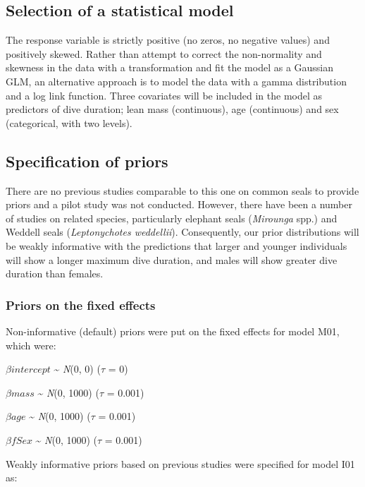 \documentclass[
]{book}
\begin{document}
\hypertarget{gamma-select}{%
\subsection{Selection of a statistical model}\label{gamma-select}}

The response variable is strictly positive (no zeros, no negative values) and positively skewed. Rather than attempt to correct the non-normality and skewness in the data with a transformation and fit the model as a Gaussian GLM, an alternative approach is to model the data with a gamma distribution and a log link function. Three covariates will be included in the model as predictors of dive duration; lean mass (continuous), age (continuous) and sex (categorical, with two levels).

\hypertarget{gamma-prior-spec}{%
\subsection{Specification of priors}\label{gamma-prior-spec}}

There are no previous studies comparable to this one on common seals to provide priors and a pilot study was not conducted. However, there have been a number of studies on related species, particularly elephant seals (\emph{Mirounga} spp.) and Weddell seals (\emph{Leptonychotes weddellii}). Consequently, our prior distributions will be weakly informative with the predictions that larger and younger individuals will show a longer maximum dive duration, and males will show greater dive duration than females.

\hypertarget{gamma-priors-fixed}{%
\subsubsection{Priors on the fixed effects}\label{gamma-priors-fixed}}

Non-informative (default) priors were put on the fixed effects for model M01, which were:

\(\beta intercept\) \textasciitilde{} \emph{N}(0, 0) (\(\tau\) = 0)

\(\beta mass\) \textasciitilde{} \emph{N}(0, 1000) (\(\tau\) = 0.001)

\(\beta age\) \textasciitilde{} \emph{N}(0, 1000) (\(\tau\) = 0.001)

\(\beta fSex\) \textasciitilde{} \emph{N}(0, 1000) (\(\tau\) = 0.001)

Weakly informative priors based on previous studies were specified for model I01 as:
\end{document}
